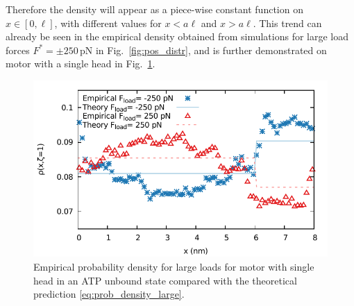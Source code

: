 \documentclass[aps,pre,twocolumn,showpacs,showkeys,superscriptaddress,floatfix]{revtex4-1}
\begin{document}
Therefore the density will appear as a piece-wise constant function on $x \in [0,\ell]$, with different values for $x < a \ell$ and $x > a \ell$. 
This trend can already be seen in the empirical density obtained from simulations for large load forces $F^* = \pm 250 \, \mathrm{pN}$ in Fig.~\ref{fig:pos_distr},
and is further demonstrated on motor with a single head in Fig.~\ref{fig:prob_density_large}. 
\begin{figure}[t]
\centering
\includegraphics[width=0.9\linewidth,height=!]{pos_compare.pdf}
\caption{\label{fig:prob_density_large}
Empirical probability density for large loads for motor with single head in an ATP unbound state compared with the theoretical prediction \eqref{eq:prob_density_large}.
}
\end{figure}
\end{document}
